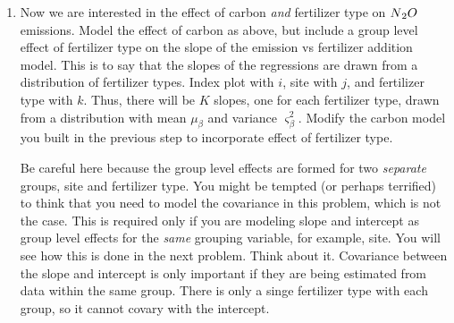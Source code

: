 \documentclass[12pt, oneside]{article}
\newif\ifanswers
\begin{document}
\begin{enumerate} [leftmargin=*]
\ifanswers
\newpage
\begin{center}
\texttt{[image: DAG3.png]}
\end{center}
\begin{align*}
g_{1}\big(\alpha_{j},\beta,\log(x_{ij})\big)  &=\alpha_{j}+\beta\log\big(\log(x_{ij})\big)\\
g_{2}\big(\kappa,\eta,\text{logit}(w_{j})\big) &= \kappa+\eta\text{logit}\big(w_{j}\big)\\
\big[\bm{\alpha},\beta,\sigma,\varsigma_{\alpha},\kappa,\eta\mid\mathbf{y}\big] &\propto \prod_{j=1}^{J}\prod_{i=1}^{n_{j}}\text{normal}\big(\log(y_{ij}\big)\mid g_{1}\big(\alpha_{j},\beta,\log(x_{ij})\big),\sigma^{2}\big)\label{eq:mean model for N02 intecept-1}\\
 &\times \text{normal}\big(\alpha_{j}\mid g_{2}\big(\kappa,\eta,\text{logit}(w_{j})\big),\varsigma_{\alpha}^{2}\big)\\
 &\times \text{normal}\big(\beta \mid 0,1000\big)\\
 &\times \text{normal}\big(\eta \mid 0,1000\big)\\
 &\times \text{normal}\big(\kappa \mid 0,1000\big)\\
 &\times \text{uniform}\big(\sigma \mid 0,200\big)\\
 &\times \text{uniform}\big(\varsigma_{\alpha} \mid 0,200\big)\\
\end{align*}
\fi

We logit transform the carbon data so they include all real numbers, which is necessary for normal distribution that we use to model the intercepts.
\newpage 

\item Now we are interested in the effect of carbon \emph{and }fertilizer type on $N\textsubscript{2}O$ emissions. Model the effect of carbon as above, but include a group level effect of fertilizer type on the slope of the emission vs fertilizer addition model. This is to say that the slopes of the regressions are drawn from a distribution of fertilizer types. Index plot with $i$, site with $j$, and fertilizer type with $k$. Thus, there will be $K$ slopes, one for each fertilizer
type, drawn from a distribution with mean $\mu_{\beta}$ and variance $\varsigma_{\beta}^{2}$. Modify the carbon model you built in the previous step to incorporate effect of fertilizer type.  

Be careful here because the group level effects are formed for two \emph{separate} groups, site and fertilizer type.  You might be tempted (or perhaps terrified)  to think that you need to model the covariance in this problem, which is not the case.  This is required only if you are modeling slope and intercept as group level effects for the \emph{same} grouping variable, for example, site.  You will see how this is done in the next problem.  Think about it. Covariance between the slope and intercept is only important if they are being estimated from data within the same group. There is only a singe fertilizer type with each group, so it cannot covary with the intercept. 


\end{enumerate}
\end{document}
